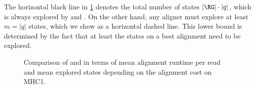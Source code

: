 The horizontal black line in \cref{TRIEfig:scaling_with_errors} denotes the total
number of states $\lvert \RG \rvert \cdot \lvert q \rvert$, which is always
explored by \bitparallel and \pasgal. On the other hand, any aligner must
explore at least $m = \lvert q \rvert$ states, which we show as a horizontal
dashed line. This lower bound is determined by the fact that at least the states
on a best alignment need to be explored.

\begin{figure}[H]
  \centering
  \caption[Performance scaling with alignment cost]{Comparison of \A and \dijkstra in terms of mean alignment runtime per read and mean explored states depending on the alignment cost on MHC1.}
  \label{TRIEfig:scaling_with_errors}
\end{figure}
